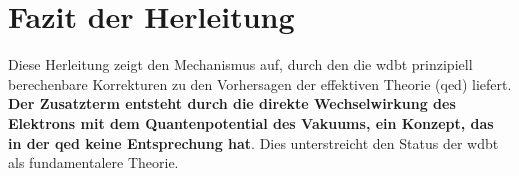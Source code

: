 \section{Fazit der Herleitung}
Diese Herleitung zeigt den Mechanismus auf, durch den die \gls{wdbt} prinzipiell berechenbare Korrekturen zu den Vorhersagen der effektiven Theorie (\gls{qed}) liefert. \textbf{Der Zusatzterm entsteht durch die
direkte Wechselwirkung des Elektrons mit dem Quantenpotential des Vakuums, ein Konzept, das in der \gls{qed} keine Entsprechung hat}. Dies unterstreicht den Status der \gls{wdbt} als fundamentalere Theorie.
